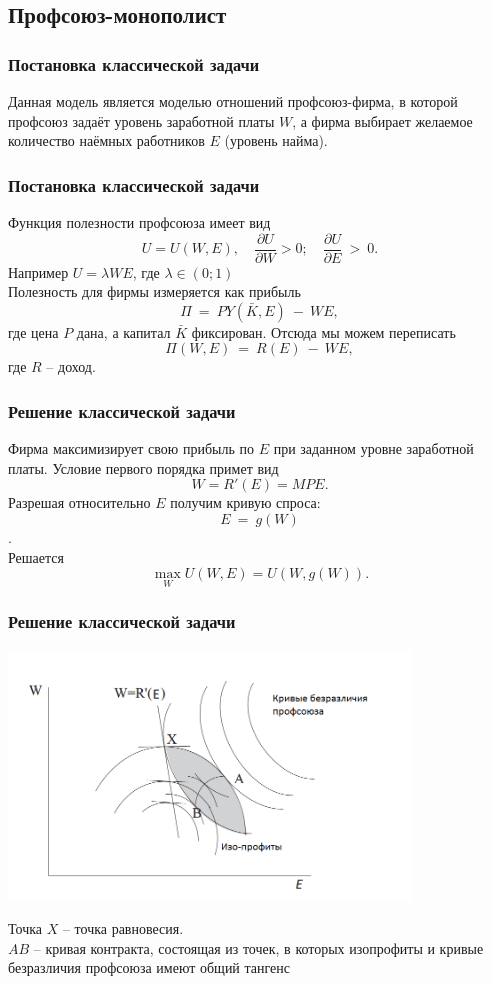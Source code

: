 \documentclass {beamer}
\begin{document}
\begin{frame}
	\section{Профсоюз-монополист}
\frametitle{Постановка классической задачи}
Данная модель является моделью отношений профсоюз-фирма, в которой профсоюз задаёт уровень заработной платы $W$, а фирма выбирает желаемое количество наёмных работников  $E$ (уровень найма).


\end{frame}

\begin{frame}

\frametitle{Постановка классической задачи}
Функция полезности профсоюза имеет вид 
$$ U = U(W,E), \quad \frac{\partial U}{\partial W} > 0; \quad \frac{\partial U}{\partial E}~>~0.$$ 
Например $U = \lambda WE$, где $\lambda \in (0; 1)$\\
Полезность для фирмы измеряется как прибыль 
$$\Pi~=~PY(\bar K,E)~-~WE,$$ 
где цена $P$ дана, а капитал $\bar K$ фиксирован. Отсюда мы можем переписать 
$$\Pi(W,E)~=~R(E)~-~WE,$$ 
где $R$ -- доход.
\end{frame}

\begin{frame}
	\frametitle{Решение классической задачи}
	
	Фирма максимизирует свою прибыль по $E$ при заданном уровне заработной платы. Условие первого порядка примет вид
	$$ W = R'(E) = MPE. $$
	Разрешая относительно $E$ получим кривую спроса: $$E~=~g(W)$$.\\
	Решается
	$$ \max_W U(W,E) = U(W,g(W)). $$
\end{frame}


\begin{frame}
	\frametitle{Решение классической задачи}

 \begin{center}
 	\includegraphics[width=0.8\textwidth]{monopoly_union}
 \end{center}
 Точка $X$ -- точка равновесия.\\
 $AB$ -- кривая контракта, состоящая из точек, в которых изопрофиты и кривые безразличия профсоюза имеют общий тангенс
\end{frame}
\end{document}
